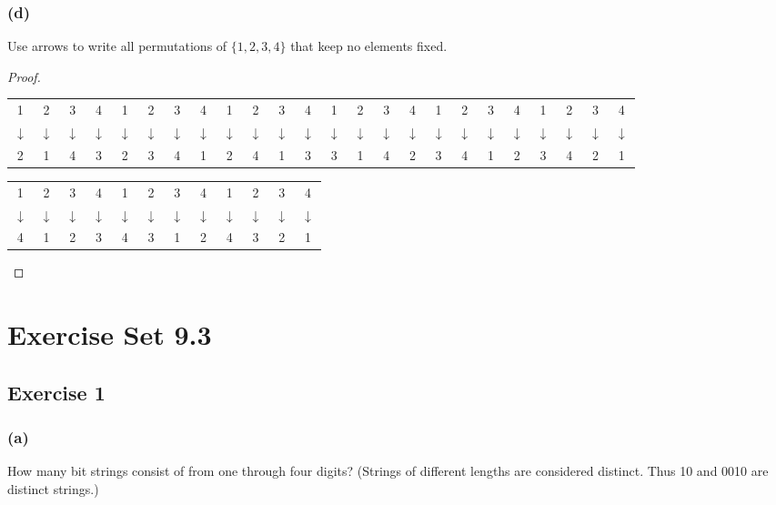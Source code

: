 \documentclass[14pt]{extarticle}
\newcommand{\cyda}{{\cy \(\downarrow\)}}
\newcommand{\cy}{\color{cyan}}
\begin{document}
\subsubsection{(d)}
Use arrows to write all permutations of \(\{1, 2, 3, 4\}\) that keep no elements fixed.

\begin{proof}
\begin{center}
\begin{tabular}{cccc|cccc|cccc|cccc|cccc|cccc}
1&2&3&4&1&2&3&4&1&2&3&4&1&2&3&4&1&2&3&4&1&2&3&4 \\
\cyda & \cyda & \cyda & \cyda & \cyda & \cyda & \cyda & \cyda & \cyda & \cyda & \cyda & \cyda & \cyda & \cyda & 
\cyda & \cyda & \cyda & \cyda & \cyda & \cyda & \cyda & \cyda & \cyda & \cyda \\
2&1&4&3&2&3&4&1&2&4&1&3&3&1&4&2&3&4&1&2&3&4&2&1
\end{tabular}
\end{center}
\begin{center}
\begin{tabular}{cccc|cccc|cccc}
1&2&3&4&1&2&3&4&1&2&3&4\\
\cyda & \cyda & \cyda & \cyda & \cyda & \cyda & \cyda & \cyda & \cyda & \cyda & \cyda & \cyda \\
4&1&2&3&4&3&1&2&4&3&2&1
\end{tabular}
\end{center}
\end{proof}

\section{Exercise Set 9.3}

\subsection{Exercise 1}
\subsubsection{(a)}
How many bit strings consist of from one through four digits? (Strings of different lengths are considered 
distinct. Thus 10 and 0010 are distinct strings.)
\end{document}
